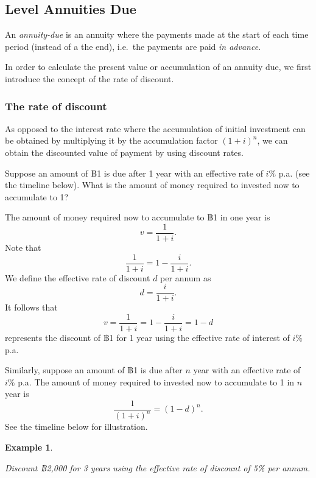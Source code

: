 \documentclass[
]{book}
\theoremstyle{definition}
\theoremstyle{definition}
\newtheorem{example}{Example}[chapter]
\theoremstyle{definition}
\theoremstyle{definition}
\theoremstyle{remark}
\begin{document}
\hypertarget{level-annuities-due}{%
\subsection{Level Annuities Due}\label{level-annuities-due}}

An \emph{annuity-due} is an annuity where the payments made at the start of
each time period (instead of a the end), i.e.~the payments are paid \emph{in
advance}.

In order to calculate the present value or accumulation of an annuity
due, we first introduce the concept of the rate of discount.

\hypertarget{the-rate-of-discount}{%
\subsubsection*{The rate of discount}\label{the-rate-of-discount}}

As opposed to the interest rate where the accumulation of initial
investment can be obtained by multiplying it by the accumulation factor
\((1+i)^n\), we can obtain the discounted value of payment by using
discount rates.

Suppose an amount of ฿1 is due after 1 year with an effective rate of
\(i \%\) p.a. (see the timeline below). What is the amount of money
required to invested now to accumulate to 1?

The amount of money required now to accumulate to ฿1 in one year is
\[v =  \frac{1}{1+i}.\] Note that \[\frac{1}{1+i} = 1 - \frac{i}{1+i}.\]
We define the effective rate of discount \(d\) per annum
as\[d = \frac{i}{1+i}.\] It follows that
\[v = \frac{1}{1+i} = 1 - \frac{i}{1+i} =  1 - d\] represents the
discount of ฿1 for 1 year using the effective rate of interest of \(i \%\)
p.a.

Similarly, suppose an amount of ฿1 is due after \(n\) year with an
effective rate of \(i \%\) p.a. The amount of money required to invested
now to accumulate to 1 in \(n\) year is \[\frac{1}{(1+i)^n} = (1-d)^n.\]
See the timeline below for illustration.

\begin{example}
\protect\hypertarget{exm:unlabeled-div-28}{}\label{exm:unlabeled-div-28}

\emph{Discount ฿2,000 for 3 years using the effective rate of discount of 5\%
per annum.}

\end{example}
\end{document}
